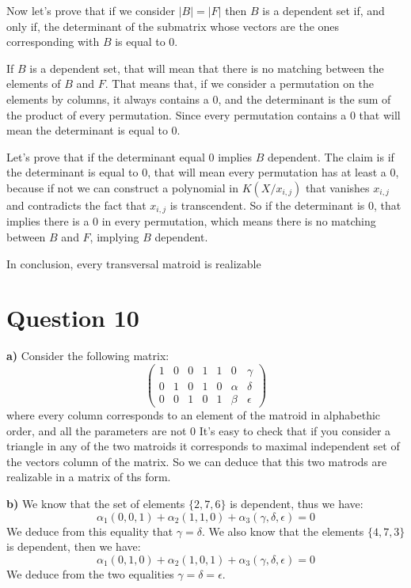 \documentclass[12pt]{article}
\begin{document}
Now let's prove that if we consider $|B|=|F|$ then $B$ is a dependent set if, and only if, the determinant of the submatrix whose vectors are the ones corresponding with $B$ is equal to $0$.

If $B$ is a dependent set, that will mean that there is no matching between the elements of $B$ and $F$. That means that, if we consider a permutation on the elements by columns, it always contains a $0$, and the determinant is the sum of the product of every permutation. Since every permutation contains a $0$ that will mean the determinant is equal to $0$.

Let's prove that if the determinant equal $0$ implies $B$ dependent. The claim is if the determinant is equal to $0$, that will mean every permutation has at least a $0$, because if not we can construct a polynomial in $K(X\mathrm{/} x_{i,j})$ that vanishes $x_{i,j}$ and contradicts the fact that $x_{i,j}$ is transcendent. So if the determinant is $0$, that implies there is a $0$ in every permutation, which means there is no matching between $B$ and $F$, implying $B$ dependent.

In conclusion, every transversal matroid is realizable

\section{Question 10}

\textbf{a)} Consider the following matrix:
$$
\begin{pmatrix}
1 & 0 & 0 & 1 & 1 & 0 & \gamma\\
0 & 1 & 0 & 1 & 0 & \alpha & \delta\\
0 & 0 & 1 & 0 & 1 & \beta & \epsilon
\end{pmatrix}
$$
where every column corresponds to an element of the matroid in alphabethic order, and all the parameters are not $0$
It's easy to check that if you consider a triangle in any of the two matroids it corresponds to maximal independent set of the vectors column of the matrix. So we can deduce that this two matrods are realizable in a matrix of ths form.

\textbf{b)} We know that the set of elements $\{2,7,6\}$ is dependent, thus we have:
$$
\alpha_{1}(0,0,1)+\alpha_{2}(1,1,0)+\alpha_{3}(\gamma,\delta,\epsilon)=0
$$
We deduce from this equality that $\gamma=\delta$.
We also know that the elements $\{4,7,3\}$ is dependent, then we have:
$$
\alpha_{1}(0,1,0)+\alpha_{2}(1,0,1)+\alpha_{3}(\gamma,\delta,\epsilon)=0
$$
We deduce from the two equalities $\gamma=\delta=\epsilon$.
\end{document}
